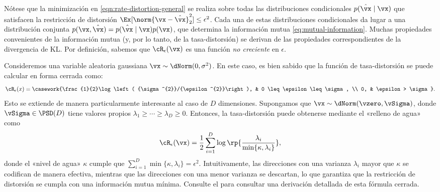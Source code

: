 \documentclass[../../book-main.tex]{subfiles}
\begin{document}
Nótese que la minimización
en \eqref{eqn:rate-distortion-general} se realiza sobre todas las distribuciones condicionales
$p(\hat \vx \mid \vx)$ 
que satisfacen la restricción de distorsión $\Ex[\norm{\vx-
\hat \vx}_2^{2}] \le \epsilon^{2}$. Cada una de estas distribuciones condicionales da lugar a una distribución conjunta $p(\vx,
\hat{\vx}) = p(\hat{\vx} \mid \vx) p(\vx)$, que determina la información mutua
\eqref{eq:mutual-information}.
Muchas propiedades convenientes de la información mutua (y, por lo tanto, de la 
tasa-distorsión) se derivan de las propiedades correspondientes de la divergencia de KL.
Por definición, sabemos que $\cR_{\epsilon}(\vx)$ es una función {\em
no creciente} en $\epsilon$.

\begin{example}\label{ex:gaussian_rate_distortion}
    Consideremos una variable aleatoria gaussiana \(\vx \sim \dNorm(0,
    \sigma^{2})\). En este caso,
    es bien sabido que la función de tasa-distorsión se puede
    calcular en forma cerrada como:
    \begin{equation}
        \cR_{\epsilon}(x) =
        \casework{\frac{1}{2}\log\left(
            {\sigma^{2}}/{\epsilon^{2}}\right), & 0 \leq
        \epsilon \leq \sigma, \\ 0, & \epsilon > \sigma}.
    \end{equation}
    Esto se extiende de manera particularmente interesante al caso de
    \(D\) dimensiones. Supongamos que \(\vx \sim \dNorm(\vzero,
    \vSigma)\), donde  \(\vSigma \in \PSD(D)\) tiene valores propios
    \(\lambda_{1} \geq \cdots \geq \lambda_{D} \geq 0\). Entonces, la 
    tasa-distorsión puede obtenerse  mediante el «relleno de agua» como
    \begin{equation}
        \cR_{\epsilon}(\vx) = \frac{1}{2} \sum_{i =
        1}^{D}\log\rp{\frac{\lambda_{i}}{\min\{\kappa, \lambda_{i}\}}},
    \end{equation}
    donde el «nivel de agua» \(\kappa\) cumple que \(\sum_{i =
    1}^{D}\min\{\kappa, \lambda_{i}\} = \epsilon^{2}\). Intuitivamente,
    las direcciones con una varianza \(\lambda_{i}\) mayor que \(\kappa\)
    se codifican de manera efectiva, mientras que las direcciones con una menor varianza 
    se descartan, lo que garantiza que la restricción de distorsión se
    cumpla con una información mutua mínima. Consulte el
     para consultar una derivación detallada de esta fórmula cerrada.
\end{example}
\end{document}
